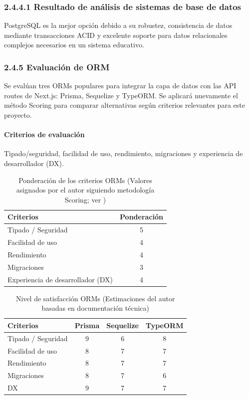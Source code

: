 \subsubsection{2.4.4.1 Resultado de análisis de sistemas de base de datos}
PostgreSQL es la mejor opción debido a su robustez, consistencia de datos mediante transacciones ACID y excelente soporte para datos relacionales complejos necesarios en un sistema educativo.

\subsubsection{2.4.5 Evaluación de ORM}
Se evalúan tres ORMs populares para integrar la capa de datos con las API routes de Next.js: Prisma, Sequelize y TypeORM. Se aplicará nuevamente el método Scoring \cite{belton2002} para comparar alternativas según criterios relevantes para este proyecto.

\paragraph{Criterios de evaluación}
Tipado/seguridad, facilidad de uso, rendimiento, migraciones y experiencia de desarrollador (DX).
\begin{table}[ht]
\centering
\caption{Ponderación de los criterios ORMs (Valores asignados por el autor siguiendo metodología Scoring; ver \cite{belton2002})}
\begin{tabular}{l c}
\hline
Criterios & Ponderación \\
\hline
Tipado / Seguridad & 5 \\
Facilidad de uso & 4 \\
Rendimiento & 4 \\
Migraciones & 3 \\
Experiencia de desarrollador (DX) & 4 \\
\hline
\end{tabular}
\end{table}
\FloatBarrier

\begin{table}[ht]
\centering
\caption{Nivel de satisfacción ORMs (Estimaciones del autor basadas en documentación técnica)}
\begin{tabular}{l c c c}
\hline
Criterios & Prisma & Sequelize & TypeORM \\
\hline
Tipado / Seguridad & 9 & 6 & 8 \\
Facilidad de uso & 8 & 7 & 7 \\
Rendimiento & 8 & 7 & 7 \\
Migraciones & 8 & 7 & 6 \\
DX & 9 & 7 & 7 \\
\hline
\end{tabular}
\end{table}
\FloatBarrier

